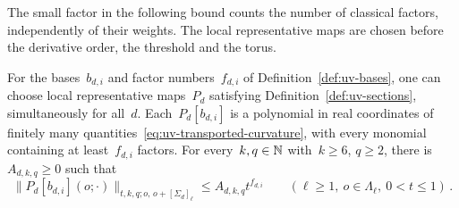 The small factor in the following bound counts the number of classical factors, independently of their weights.
The local representative maps are chosen before the derivative order, the threshold and the torus.

\begin{proposition}\label{prop:uv-sections}
For the bases~$b_{d,i}$ and factor numbers~$f_{d,i}$ of Definition~\ref{def:uv-bases}, one can choose local representative maps~$P_d$ satisfying Definition~\ref{def:uv-sections}, simultaneously for all~$d$.
Each~$P_d[b_{d,i}]$ is a polynomial in real coordinates of finitely many quantities~\eqref{eq:uv-transported-curvature}, with every monomial containing at least~$f_{d,i}$ factors.
For every~$k,q\in\mathbb N$ with~$k\ge6$, $q\ge2$, there is~$A_{d,k,q}\ge0$ such that
\begin{equation}\label{eq:uv-section-bound}
 \bigl\|P_d[b_{d,i}](o;\cdot)\bigr\|_{t,k,q;o,\,o+[\Sigma_d]_\ell}
 \le A_{d,k,q}t^{f_{d,i}}
 \qquad(\ell\ge1,\ o\in\Lambda_\ell,\ 0<t\le1)\,.
\end{equation}
\end{proposition}

